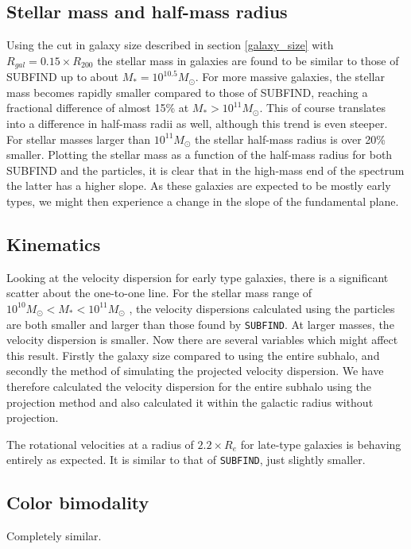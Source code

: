 \subsection{Stellar mass and half-mass radius}

Using the cut in galaxy size described in section \ref{galaxy_size} with $R_{gal} = 0.15 \times R_{200}$ the stellar mass in galaxies are found to be similar to those of SUBFIND up to about $M_* = 10^{10.5} M_{\odot}$. For more massive galaxies, the stellar mass becomes rapidly smaller compared to those of SUBFIND, reaching a fractional difference of almost 15\% at $M_* > 10^{11} M_{\odot}$. This of course translates into a difference in half-mass radii as well, although this trend is even steeper. For stellar masses larger than $10^{11} M_{\odot}$ the stellar half-mass radius is over 20\% smaller. Plotting the stellar mass as a function of the half-mass radius for both SUBFIND and the particles, it is clear that in the high-mass end of the spectrum the latter has a higher slope. As these galaxies are expected to be mostly early types, we might then experience a change in the slope of the fundamental plane.


\subsection{Kinematics}

Looking at the velocity dispersion for early type galaxies, there is a significant scatter about the one-to-one line. For the stellar mass range of $10^{10} M_{\odot} < M_* < 10^{11} M_{\odot}$ , the velocity dispersions calculated using the particles are both smaller and larger than those found by \texttt{SUBFIND}. At larger masses, the velocity dispersion is smaller. Now there are several variables which might affect this result. Firstly the galaxy size compared to using the entire subhalo, and secondly the method of simulating the projected velocity dispersion. We have therefore calculated the velocity dispersion for the entire subhalo using the projection method and also calculated it within the galactic radius without projection.

The rotational velocities at a radius of $2.2 \times R_{e}$ for late-type galaxies is behaving entirely as expected. It is similar to that of \texttt{SUBFIND}, just slightly smaller. 

\subsection{Color bimodality}

Completely similar.